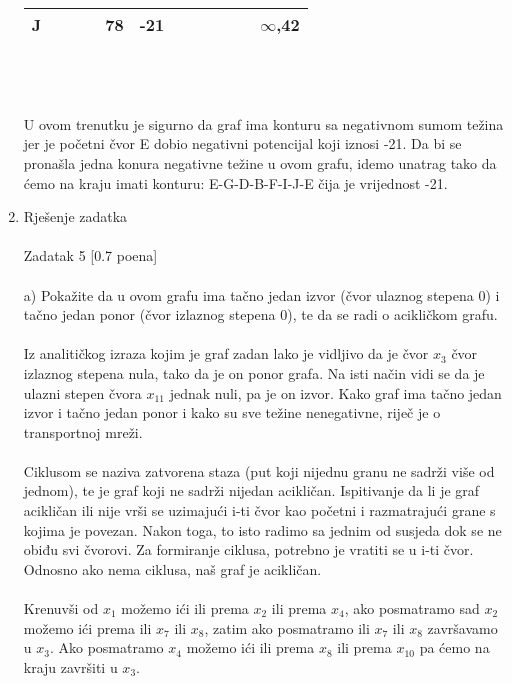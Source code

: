 \documentclass[12pt]{article}
\begin{document}
\begin{enumerate}
\begin{tabular}{|c|c|c|c|c|c|c|c|c|c|c|c|}
J     & {\color[HTML]{000000} }         & {\color[HTML]{000000} }         & {\color[HTML]{000000} }         & {\color[HTML]{000000} 78}       & {\color[HTML]{FE0000} -21} & {\color[HTML]{000000} }         & {\color[HTML]{000000} }         & {\color[HTML]{000000} }         & {\color[HTML]{000000} }         & {\color[HTML]{000000} }         & {\color[HTML]{000000} $\infty$,42}    \\ \hline
\end{tabular}
\\
\\
\\
U ovom trenutku je sigurno da graf ima konturu sa negativnom sumom težina jer je početni čvor
E dobio negativni potencijal koji iznosi -21. Da bi se pronašla jedna konura negativne težine u ovom
grafu, idemo unatrag tako da ćemo na kraju imati konturu: E-G-D-B-F-I-J-E čija je vrijednost -21.
\newpage
\item Rješenje zadatka \\
\\
Zadatak 5 [0.7 poena] \\
\\
a) Pokažite da u ovom grafu ima tačno jedan izvor (čvor ulaznog stepena 0) i tačno jedan ponor (čvor izlaznog stepena 0), te da se radi o acikličkom grafu.
\\
\\
Iz analitičkog izraza kojim je graf zadan lako je vidljivo da je čvor $x_3$ čvor izlaznog stepena
nula, tako da je on ponor grafa. Na isti način vidi se da je ulazni stepen čvora $x_{11}$ jednak
nuli, pa je on izvor. Kako graf ima tačno jedan izvor i tačno jedan ponor i kako su sve težine
nenegativne, riječ je o transportnoj mreži. \\
\\
Ciklusom se naziva zatvorena staza (put koji nijednu granu ne sadrži više od jednom), te je graf
koji ne sadrži nijedan acikličan. Ispitivanje da li je graf acikličan ili nije vrši se uzimajući i-ti čvor kao početni i razmatrajući grane s kojima je povezan. Nakon toga, to isto radimo sa jednim od susjeda dok se ne obiđu svi čvorovi. Za formiranje ciklusa, potrebno je vratiti se u i-ti čvor. Odnosno ako nema ciklusa, naš graf je acikličan. \\
\\
Krenuvši od $x_1$ možemo ići ili prema $x_2$ ili prema $x_4$, ako posmatramo sad $x_2$ možemo ići prema ili $x_7$ ili $x_8$, zatim ako posmatramo ili $x_7$ ili $x_8$ završavamo u $x_3$. Ako posmatramo $x_4$ možemo ići ili prema $x_8$ ili prema $x_{10}$ pa ćemo na kraju završiti u $x_3$.

\end{enumerate}
\end{document}
